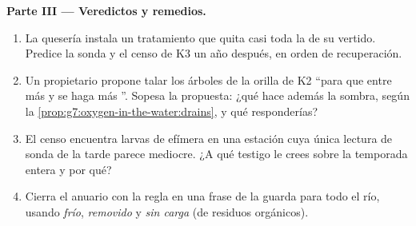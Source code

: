 \begin{problem}
\medskip\noindent\textbf{Parte III --- Veredictos y remedios.}
\begin{enumerate}[resume]
  \item La quesería instala un tratamiento que quita casi toda la
         de su vertido. Predice la sonda y el censo de
        K3 un año después, en orden de recuperación.
  \item Un propietario propone talar los árboles de la orilla de K2
        ``para que entre más  y se haga más ''. Sopesa la
        propuesta: ¿qué hace además la sombra, según la
        \cref{prop:g7:oxygen-in-the-water:drains}, y qué responderías?
  \item El censo encuentra larvas de efímera en una estación cuya única
        lectura de sonda de la tarde parece mediocre. ¿A qué testigo le
        crees sobre la temporada entera y por qué?
  \item Cierra el anuario con la regla en una frase de la guarda para
        todo el río, usando \emph{frío}, \emph{removido} y \emph{sin
        carga} (de residuos orgánicos).
\end{enumerate}
\end{problem}
